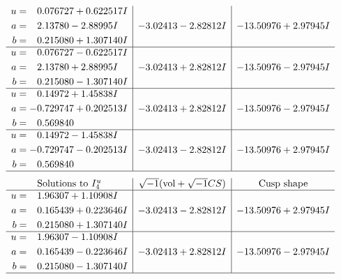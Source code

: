 \documentclass[1p]{elsarticle_modified}
\theoremstyle{definition}
\newcommand{\I}{\sqrt{-1}}
\begin{document}
$$\begin{array}{c|c|c}
\begin{aligned}
u &= \phantom{-}0.076727 + 0.622517 I \\
a &= \phantom{-}2.13780 - 2.88995 I \\
b &= \phantom{-}0.215080 + 1.307140 I\end{aligned}
 & -3.02413 - 2.82812 I & -13.50976 + 2.97945 I \\ \hline\begin{aligned}
u &= \phantom{-}0.076727 - 0.622517 I \\
a &= \phantom{-}2.13780 + 2.88995 I \\
b &= \phantom{-}0.215080 - 1.307140 I\end{aligned}
 & -3.02413 + 2.82812 I & -13.50976 - 2.97945 I \\ \hline\begin{aligned}
u &= \phantom{-}0.14972 + 1.45838 I \\
a &= -0.729747 + 0.202513 I \\
b &= \phantom{-}0.569840\phantom{ +0.000000I}\end{aligned}
 & -3.02413 + 2.82812 I & -13.50976 - 2.97945 I \\ \hline\begin{aligned}
u &= \phantom{-}0.14972 - 1.45838 I \\
a &= -0.729747 - 0.202513 I \\
b &= \phantom{-}0.569840\phantom{ +0.000000I}\end{aligned}
 & -3.02413 - 2.82812 I & -13.50976 + 2.97945 I\\
 \hline 
 \end{array}$$\newpage$$\begin{array}{c|c|c}  
\text{Solutions to }I^u_{4}& \I (\text{vol} + \sqrt{-1}CS) & \text{Cusp shape}\\
 \hline 
\begin{aligned}
u &= \phantom{-}1.96307 + 1.10908 I \\
a &= \phantom{-}0.165439 + 0.223646 I \\
b &= \phantom{-}0.215080 + 1.307140 I\end{aligned}
 & -3.02413 - 2.82812 I & -13.50976 + 2.97945 I \\ \hline\begin{aligned}
u &= \phantom{-}1.96307 - 1.10908 I \\
a &= \phantom{-}0.165439 - 0.223646 I \\
b &= \phantom{-}0.215080 - 1.307140 I\end{aligned}
 & -3.02413 + 2.82812 I & -13.50976 - 2.97945 I\\
 \hline 
 \end{array}$$\newpage
\end{document}
